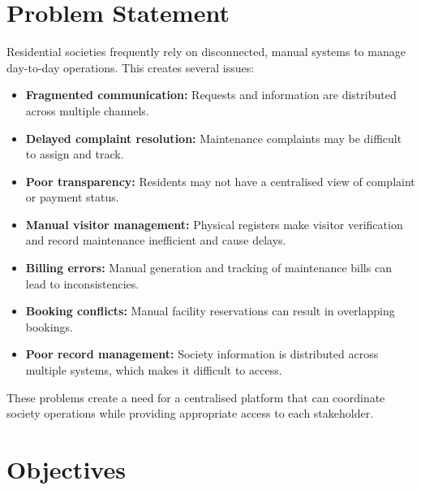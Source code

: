 \documentclass[11pt,a4paper]{article}
\begin{document}

\section{Problem Statement}

Residential societies frequently rely on disconnected, manual systems to manage day-to-day operations. This creates several issues:

\begin{itemize}

    \item \textbf{Fragmented communication:} Requests and information are distributed across multiple channels.

    \item \textbf{Delayed complaint resolution:} Maintenance complaints may be difficult to assign and track.

    \item \textbf{Poor transparency:} Residents may not have a centralised view of complaint or payment status.

    \item \textbf{Manual visitor management:} Physical registers make visitor verification and record maintenance inefficient and cause delays.

    \item \textbf{Billing errors:} Manual generation and tracking of maintenance bills can lead to inconsistencies.

    \item \textbf{Booking conflicts:} Manual facility reservations can result in overlapping bookings.

    \item \textbf{Poor record management:} Society information is distributed across multiple systems, which makes it difficult to access.

\end{itemize}

These problems create a need for a centralised platform that can coordinate society operations while providing appropriate access to each stakeholder.


\section{Objectives}
\end{document}

